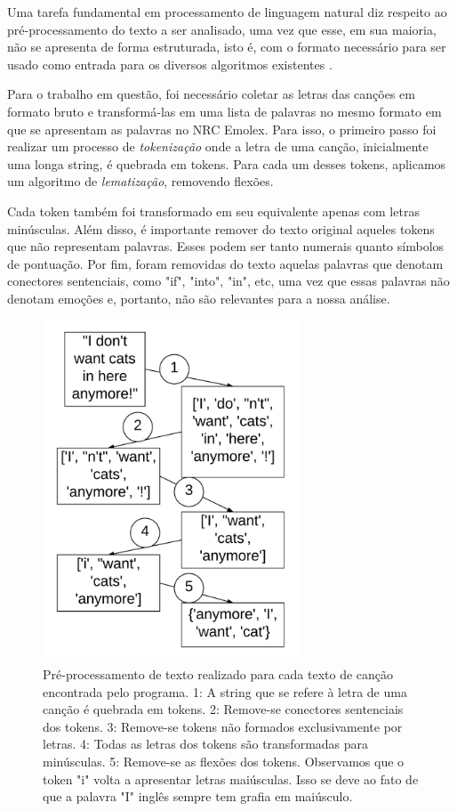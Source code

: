 Uma tarefa fundamental em processamento de linguagem natural diz respeito 
ao pré-processamento do texto a ser analisado, uma vez que esse, em sua 
maioria, não se apresenta de forma estruturada, isto é, com o formato
necessário para ser usado como entrada para os diversos algoritmos existentes
\cite{Manning:1999:FSN:311445}.

Para o trabalho em questão, foi necessário coletar as letras das canções em 
formato bruto e transformá-las em uma lista de palavras no mesmo formato em
que se apresentam as palavras no NRC Emolex. Para isso, o primeiro passo
foi realizar um processo de \textit{tokenização} onde a letra de uma canção,
inicialmente uma longa string, é quebrada em tokens. Para cada um desses
tokens, aplicamos um algoritmo de \textit{lematização}, removendo flexões.

Cada token também foi transformado em seu equivalente apenas com letras
minúsculas. Além disso, é importante remover do texto original aqueles tokens que não representam palavras. Esses podem ser tanto numerais quanto símbolos de pontuação. Por fim, foram removidas do texto aquelas palavras que denotam
conectores sentenciais, como "if", "into", "in", etc, uma vez que essas
palavras não denotam emoções e, portanto, não são relevantes para a nossa
análise.

\begin{figure}
\includegraphics[height=4in, width=3in]{textpre.png}
\caption{Pré-processamento de texto realizado para cada texto de canção
encontrada pelo programa. 1: A string que se refere à letra de uma canção
é quebrada em tokens. 2: Remove-se conectores sentenciais dos tokens.
3: Remove-se tokens não formados exclusivamente por letras. 4:
Todas as letras dos tokens são transformadas para minúsculas. 
5: Remove-se as flexões dos tokens. Observamos que o token "i" volta 
a apresentar letras maiúsculas. Isso se deve ao fato de que a palavra
"I" inglês sempre tem grafia em maiúsculo.}
\label{fig:music-mood}
\end{figure}

